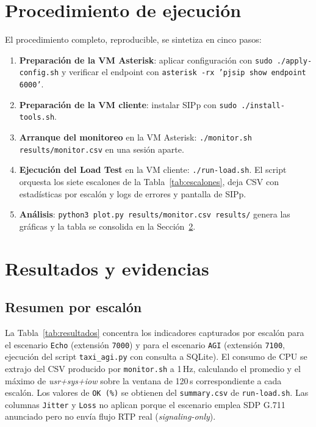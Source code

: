 \documentclass[conference]{IEEEtran}
\begin{document}
\section{Procedimiento de ejecuci\'on}

El procedimiento completo, reproducible, se sintetiza en cinco pasos:

\begin{enumerate}
    \item \textbf{Preparaci\'on de la VM Asterisk}: aplicar
    configuraci\'on con \texttt{sudo ./apply-config.sh} y verificar el
    endpoint con \texttt{asterisk -rx 'pjsip show endpoint 6000'}.
    \item \textbf{Preparaci\'on de la VM cliente}: instalar SIPp con
    \texttt{sudo ./install-tools.sh}.
    \item \textbf{Arranque del monitoreo} en la VM Asterisk:
    \texttt{./monitor.sh results/monitor.csv} en una sesi\'on aparte.
    \item \textbf{Ejecuci\'on del Load Test} en la VM cliente:
    \texttt{./run-load.sh}. El script orquesta los siete escalones de
    la Tabla~\ref{tab:escalones}, deja CSV con estad\'isticas por
    escal\'on y logs de errores y pantalla de SIPp.
    \item \textbf{An\'alisis}: \texttt{python3 plot.py
    results/monitor.csv results/} genera las gr\'aficas y la tabla se
    consolida en la Secci\'on~\ref{sec:resultados}.
\end{enumerate}

\section{Resultados y evidencias}
\label{sec:resultados}

\subsection{Resumen por escal\'on}

La Tabla~\ref{tab:resultados} concentra los indicadores capturados por
escal\'on para el escenario \texttt{Echo} (extensi\'on \texttt{7000}) y
para el escenario \texttt{AGI} (extensi\'on \texttt{7100}, ejecuci\'on
del script \texttt{taxi\_agi.py} con consulta a SQLite). El consumo de
CPU se extrajo del CSV producido por \texttt{monitor.sh} a 1\,Hz,
calculando el promedio y el m\'aximo de \textit{usr+sys+iow} sobre la
ventana de 120\,s correspondiente a cada escal\'on. Los valores de
\texttt{OK\,(\%)} se obtienen del \texttt{summary.csv} de
\texttt{run-load.sh}. Las columnas \texttt{Jitter} y \texttt{Loss} no
aplican porque el escenario emplea SDP G.711 anunciado pero no env\'ia
flujo RTP real (\textit{signaling-only}).
\end{document}
